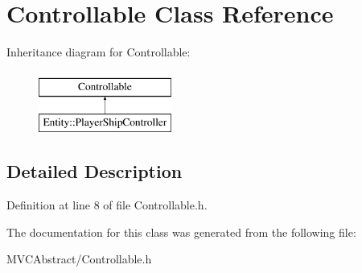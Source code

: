\hypertarget{classControllable}{}\section{Controllable Class Reference}
\label{classControllable}
Inheritance diagram for Controllable\+:\begin{figure}[H]
\begin{center}
\leavevmode
\includegraphics[height=2.000000cm]{classControllable}
\end{center}
\end{figure}


\subsection{Detailed Description}


Definition at line 8 of file Controllable.\+h.



The documentation for this class was generated from the following file\+:\begin{DoxyCompactItemize}
\item 
M\+V\+C\+Abstract/Controllable.\+h\end{DoxyCompactItemize}
